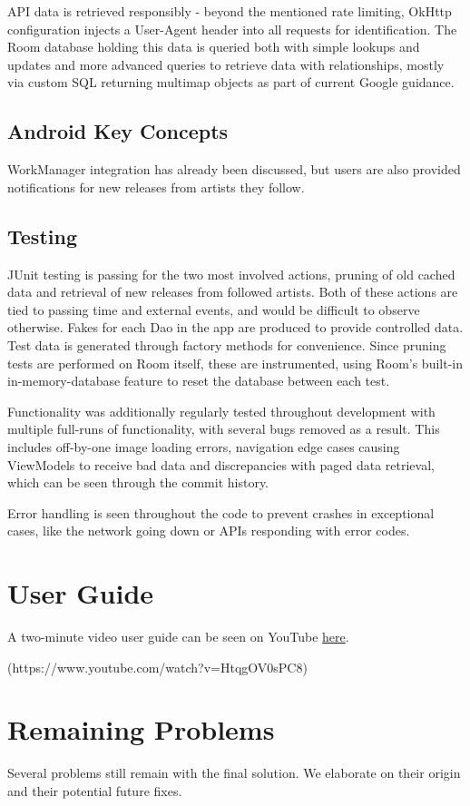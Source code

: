 \documentclass[]{article}
\begin{document}
API data is retrieved responsibly - beyond the mentioned rate limiting, OkHttp configuration injects a User-Agent header into all requests for identification. The Room database holding this data is queried both with simple lookups and updates and more advanced queries to retrieve data with relationships, mostly via custom SQL returning multimap objects as part of current Google guidance.

\subsection{Android Key Concepts}
WorkManager integration has already been discussed, but users are also provided notifications for new releases from artists they follow. 

\subsection{Testing}
JUnit testing is passing for the two most involved actions, pruning of old cached data and retrieval of new releases from followed artists. Both of these actions are tied to passing time and external events, and would be difficult to observe otherwise. Fakes for each Dao in the app are produced to provide controlled data. Test data is generated through factory methods for convenience. Since pruning tests are performed on Room itself, these are instrumented, using Room's built-in in-memory-database feature to reset the database between each test.

Functionality was additionally regularly tested throughout development with multiple full-runs of functionality, with several bugs removed as a result. This includes off-by-one image loading errors, navigation edge cases causing ViewModels to receive bad data and discrepancies with paged data retrieval, which can be seen through the commit history.

Error handling is seen throughout the code to prevent crashes in exceptional cases, like the network going down or APIs responding with error codes.

\section{User Guide}
A two-minute video user guide can be seen on YouTube \href{https://www.youtube.com/watch?v=HtqgOV0sPC8}{here}.

(https://www.youtube.com/watch?v=HtqgOV0sPC8)

\section{Remaining Problems}
Several problems still remain with the final solution. We elaborate on their origin and their potential future fixes.
\end{document}
